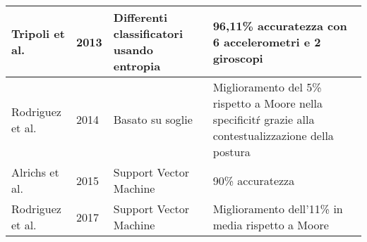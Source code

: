 \begin{table}[]
{\begin{tabular}{|l|l|l|p{4cm}|}
			Tripoli et al.   & 2013          & Differenti classificatori usando entropia & 96,11\% accuratezza con 6 accelerometri e 2 giroscopi                                                  \\ \hline
			Rodriguez et al. & 2014          & Basato su soglie                          & Miglioramento del 5\% rispetto a Moore nella specificitŕ grazie alla contestualizzazione della postura \\ \hline
			Alrichs et al.   & 2015          & Support Vector Machine                    & 90\% accuratezza                                                                                       \\ \hline
			Rodriguez et al. & 2017          & Support Vector Machine                    & Miglioramento dell'11\% in media rispetto a Moore                                                      \\ \hline
		\end{tabular}%
	}
\end{table}